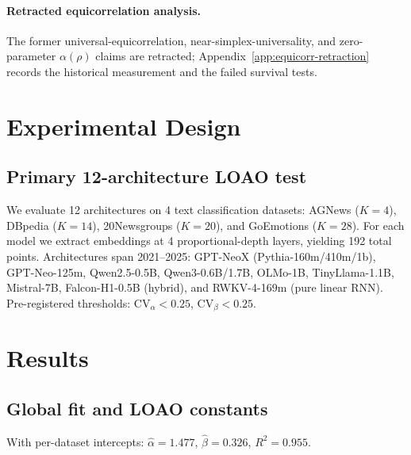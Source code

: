 \documentclass{article}
\begin{document}
\paragraph{Retracted equicorrelation analysis.}
The former universal-equicorrelation, near-simplex-universality, and zero-parameter $\alpha(\rho)$ claims are retracted; Appendix~\ref{app:equicorr-retraction} records the historical measurement and the failed survival tests.

\section{Experimental Design}
\subsection{Primary 12-architecture LOAO test}
We evaluate 12 architectures on 4 text classification datasets: AGNews ($K=4$), DBpedia ($K=14$), 20Newsgroups ($K=20$), and GoEmotions ($K=28$). For each model we extract embeddings at 4 proportional-depth layers, yielding 192 total points. Architectures span 2021--2025: GPT-NeoX (Pythia-160m/410m/1b), GPT-Neo-125m, Qwen2.5-0.5B, Qwen3-0.6B/1.7B, OLMo-1B, TinyLlama-1.1B, Mistral-7B, Falcon-H1-0.5B (hybrid), and RWKV-4-169m (pure linear RNN). Pre-registered thresholds: $\mathrm{CV}_\alpha<0.25$, $\mathrm{CV}_\beta<0.25$.

\section{Results}
\subsection{Global fit and LOAO constants}
With per-dataset intercepts: $\hat\alpha=1.477$, $\hat\beta=0.326$, $R^2=0.955$.
\end{document}
